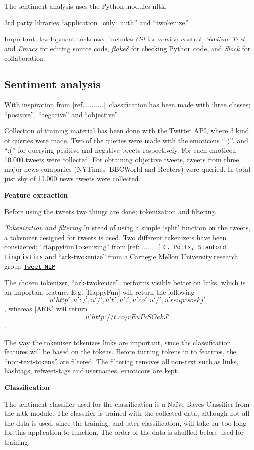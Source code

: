 \documentclass[Main]{subfiles}
\begin{document}



The sentiment analysis uses the Python modules nltk, 

3rd party libraries ``application\_only\_auth'' and ``twokenize''

Important development tools used includes \textit{Git} for version control, \textit{Sublime Text} and \textit{Emacs} for editing source code, \textit{flake8} for checking Python code, and \textit{Slack} for collaboration.




\subsection{Sentiment analysis}


With inspiration from [ref...........], classification has been made with three classes; ``positive'', ``negative'' and ``objective''.

Collection of training material has been done with the Twitter API, where 3 kind of queries were made. Two of the queries were made with the emoticons ``:)'', and ``:('' for querying positive and negative tweets respectively. For each emoticon 10.000 tweets were collected. For obtaining objective tweets, tweets from three major news companies (NYTimes, BBCWorld and Reuters) were queried. In total just shy of 10.000 news tweets were collected. 

\textbf{Feature extraction}

Before using the tweets two things are done; tokenization and filtering.

\textit{Tokenization and filtering}
In stead of using a simple `split' function on the tweets, a tokenizer designed for tweets is used. Two different tokenizers have been considered; ``HappyFunTokenizing'' from [ref: .........] \href{http://sentiment.christopherpotts.net/tokenizing.html}{\tt C. Potts, Stanford Linguistics} and ``ark-twokenize'' from a Carnegie Mellon University research group \href{http://www.ark.cs.cmu.edu/TweetNLP/}{\tt Tweet NLP}

The chosen tokenizer, ``ark-twokenize'', performs visibly better on links, which is an important feature. E.g. [HappyFun] will return the following 
\[u'http', u':/', u'/', u't', u'.', u'co', u'/', u'reupcsoekj'\], whereas [ARK] will return \[u'http://t.co/rEuPcSOekJ'\].

The way the tokenizer tokenizes links are important, since the classification features will be based on the tokens. Before turning tokens in to features, the ``non-text-tokens'' are filtered. The filtering removes all non-text such as links, hashtags, retweet-tags and usernames, emoticons are kept. 


\textbf{Classification}

The sentiment classifier used for the classification is a Naïve Bayes Classifier from the nltk module. The classifier is trained with the collected data, although not all the data is used, since the training, and later classification, will take far too long for this application to function. The order of the data is shuffled before used for training. 
\end{document}
